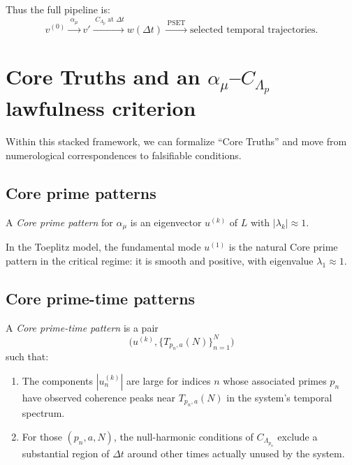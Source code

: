 \documentclass[11pt]{article}
\begin{document}
Thus the full pipeline is:
\begin{equation}
    v^{(0)} \xrightarrow{\;\alpha_\mu\;} v' \xrightarrow{\;C_{\Lambda_p}\;\text{at }\Delta t} w(\Delta t) \xrightarrow{\;\text{PSET}\;} \text{selected temporal trajectories}.
\end{equation}

\section{Core Truths and an $\alpha_\mu$--$C_{\Lambda_p}$ lawfulness criterion}

Within this stacked framework, we can formalize ``Core Truths'' and move from numerological correspondences to falsifiable conditions.

\subsection{Core prime patterns}

\begin{definition}
A \emph{Core prime pattern} for $\alpha_\mu$ is an eigenvector $u^{(k)}$ of $L$ with $|\lambda_k| \approx 1$.
\end{definition}

In the Toeplitz model, the fundamental mode $u^{(1)}$ is the natural Core prime pattern in the critical regime: it is smooth and positive, with eigenvalue $\lambda_1 \approx 1$.

\subsection{Core prime-time patterns}

\begin{definition}
A \emph{Core prime-time pattern} is a pair
\[
    \Big(u^{(k)}, \{T_{p_n,a}(N)\}_{n=1}^N\Big)
\]
such that:
\begin{enumerate}[label=(\alph*)]
    \item The components $|u^{(k)}_n|$ are large for indices $n$ whose associated primes $p_n$ have observed coherence peaks near $T_{p_n,a}(N)$ in the system's temporal spectrum.
    \item For those $(p_n,a,N)$, the null-harmonic conditions of $C_{\Lambda_{p_n}}$ exclude a substantial region of $\Delta t$ around other times actually unused by the system.
\end{enumerate}
\end{definition}
\end{document}
